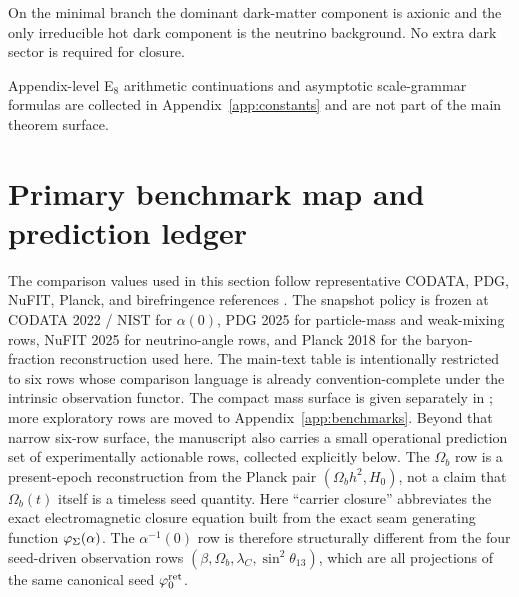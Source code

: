 \begin{remark}
On the minimal branch the dominant dark-matter component is axionic and the only irreducible
hot dark component is the neutrino background. No extra dark sector is required for closure.
\end{remark}

Appendix-level E$_8$ arithmetic continuations and asymptotic scale-grammar formulas are collected
in Appendix~\ref{app:constants} and are not part of the main theorem surface.

\section{Primary benchmark map and prediction ledger}

The comparison values used in this section follow representative CODATA, PDG, NuFIT, Planck,
and birefringence references
\cite{codata2022,pdg2025,nufit2025,planck2018,minamiKomatsu2020,eskilt2023,sullivan2025}. The
snapshot policy is frozen at CODATA 2022 / NIST for $\alpha(0)$, PDG 2025 for particle-mass and
weak-mixing rows, NuFIT 2025 for neutrino-angle rows, and Planck 2018 for the baryon-fraction
reconstruction used here. The main-text table is intentionally restricted to six rows whose
comparison language is already convention-complete under the intrinsic observation functor. The
compact mass surface is given separately in
; more exploratory rows are moved to
Appendix~\ref{app:benchmarks}. Beyond that narrow six-row surface, the manuscript also carries a
small operational prediction set of experimentally actionable rows, collected explicitly below.
The $\Omega_b$ row is a present-epoch reconstruction from the Planck pair $(\Omega_b h^2,H_0)$,
not a claim that $\Omega_b(t)$ itself is a timeless seed quantity. Here \enquote{carrier
closure} abbreviates the exact electromagnetic closure equation built from the exact seam
generating function $\varphi_{\Sigma}(\alpha)$. The $\alpha^{-1}(0)$ row is therefore structurally
different from the four seed-driven observation rows
$(\beta,\Omega_b,\lambda_C,\sin^2\theta_{13})$, which are all projections of the same canonical
seed $\varphi_0^{\mathrm{ret}}$.

